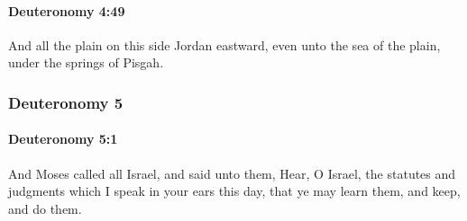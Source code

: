 		\paragraph{Deuteronomy 4:49} %
			\label{DEUTERONOMY-4-49}

			And all the plain on this side Jordan eastward, even unto the sea of the plain, under the springs of Pisgah.

	\subsubsection{Deuteronomy 5} %
		\label{DEUTERONOMY-5}

		\paragraph{Deuteronomy 5:1} %
			\label{DEUTERONOMY-5-1}

			And Moses called all Israel, and said unto them, Hear, O Israel, the statutes and judgments which I speak in your ears this day, that ye may learn them, and keep, and do them.


